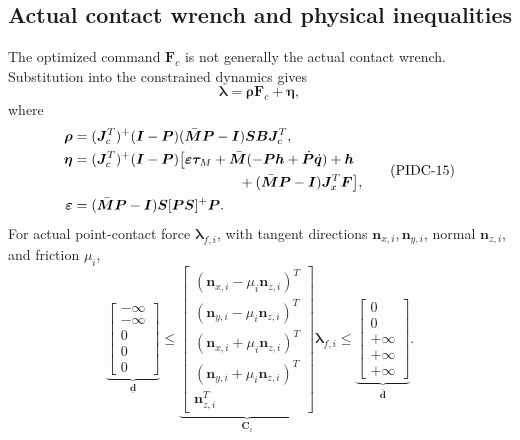 \documentclass[11pt]{article}
\newcommand{\vect}[1]{\bm{#1}}
\newcommand{\pinv}{^{+}}
\begin{document}
\subsection*{Actual contact wrench and physical inequalities}
The optimized command $\vect F_c$ is not generally the actual contact wrench.
Substitution into the constrained dynamics gives
\begin{equation}
\vect\lambda=\vect\rho\vect F_c+\vect\eta,
\tag{PIDC-14}
\end{equation}
where
\begin{equation}
\begin{split}
\vect\rho={}&(\vect J_c^T)\pinv(\vect I-\vect P)
(\bar{\vect M}\vect P-\vect I)\vect S\vect B\vect J_c^T,\\
\vect\eta={}&(\vect J_c^T)\pinv(\vect I-\vect P)
\bigl[\vect\varepsilon\vect\tau_M
+\bar{\vect M}(-\vect P\vect h+\dot{\vect P}\dot{\vect q})+\vect h\\
&\hspace{37mm}
+(\bar{\vect M}\vect P-\vect I)\vect J_x^T\vect F\bigr],\\
\vect\varepsilon={}&(\bar{\vect M}\vect P-\vect I)
\vect S[\vect P\vect S]\pinv\vect P.
\end{split}
\tag{PIDC-15}
\end{equation}
For actual point-contact force $\vect\lambda_{f,i}$, with tangent directions
$\vect n_{x,i},\vect n_{y,i}$, normal $\vect n_{z,i}$, and friction $\mu_i$,
\begin{equation}
\underbrace{\begin{bmatrix}-\infty\\-\infty\\0\\0\\0\end{bmatrix}}_{\underline{\vect d}}
\le
\underbrace{\begin{bmatrix}
(\vect n_{x,i}-\mu_i\vect n_{z,i})^T\\
(\vect n_{y,i}-\mu_i\vect n_{z,i})^T\\
(\vect n_{x,i}+\mu_i\vect n_{z,i})^T\\
(\vect n_{y,i}+\mu_i\vect n_{z,i})^T\\
\vect n_{z,i}^T
\end{bmatrix}}_{\vect C_i}
\vect\lambda_{f,i}
\le
\underbrace{\begin{bmatrix}0\\0\\+\infty\\+\infty\\+\infty\end{bmatrix}}_{\bar{\vect d}}.
\tag{PIDC-16}
\end{equation}
\end{document}
